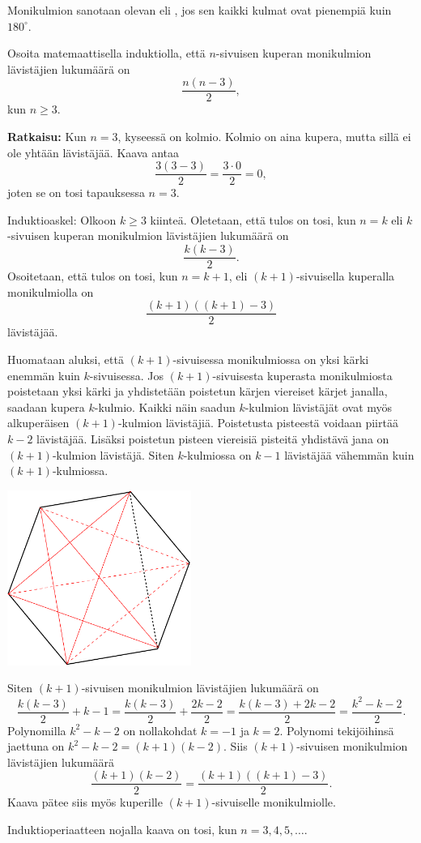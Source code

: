\begin{esimerkki}
Monikulmion sanotaan olevan  eli , jos sen kaikki kulmat ovat pienempiä kuin $180^\circ$.

Osoita matemaattisella induktiolla, että $n$-sivuisen kuperan monikulmion lävistäjien
lukumäärä on
\[
\frac{n(n-3)}{2},
\]
kun $n\ge 3$.

{\bf Ratkaisu:}
Kun $n = 3$, kyseessä on kolmio. Kolmio on aina kupera, mutta sillä ei ole yhtään lävistäjää. Kaava antaa
\[
\frac{3(3-3)}{2}=\frac{3\cdot 0}{2} =0,
\]
joten se on tosi tapauksessa $n=3$.

Induktioaskel: Olkoon $k\ge 3$ kiinteä. Oletetaan, että tulos on tosi, kun $n=k$ eli $k$-sivuisen kuperan monikulmion lävistäjien lukumäärä on
\[
\frac{k(k-3)}{2}.
\]
Osoitetaan, että tulos on tosi, kun $n=k+1$, eli $(k+1)$-sivuisella kuperalla monikulmiolla on
\[
\frac{(k+1)((k+1)-3)}{2}
\]
lävistäjää.

Huomataan aluksi, että $(k+1)$-sivuisessa monikulmiossa on yksi kärki enemmän kuin $k$-sivuisessa. Jos $(k+1)$-sivuisesta kuperasta monikulmiosta poistetaan yksi kärki ja yhdistetään poistetun kärjen viereiset kärjet janalla, saadaan kupera $k$-kulmio. Kaikki näin saadun $k$-kulmion lävistäjät ovat myös alkuperäisen $(k+1)$-kulmion lävistäjiä.
Poistetusta pisteestä voidaan piirtää $k - 2$ lävistäjää. Lisäksi poistetun pisteen viereisiä pisteitä yhdistävä jana on $(k+1)$-kulmion lävistäjä. Siten $k$-kulmiossa on $k-1$ lävistäjää vähemmän kuin $(k+1)$-kulmiossa.

\begin{center}
\includegraphics[width=6cm]{pictures/kulmiot}
\end{center}


Siten $(k + 1)$-sivuisen monikulmion lävistäjien lukumäärä on
\[
\frac{k (k - 3)}{2} +k-1=
\frac{k (k - 3)}{2} + \frac{2k - 2}{2}
=
\frac{k (k - 3)+2k-2}{2}=\frac{k^2-k-2}{2}.
\]
Polynomilla $k^2 - k - 2$ on nollakohdat $k = -1$ ja $k = 2$. Polynomi tekijöihinsä jaettuna
on $k^2 -k -2 = (k + 1)(k- 2)$. Siis $(k + 1)$-sivuisen monikulmion lävistäjien lukumäärä
\[
\frac{(k + 1)(k - 2)}{2}= \frac{(k + 1)((k + 1)-3)}{2}.
\]
Kaava pätee siis myös kuperille $(k + 1)$-sivuiselle monikulmiolle.

Induktioperiaatteen nojalla kaava on tosi, kun $n=3, 4, 5, \ldots$.
\end{esimerkki}

